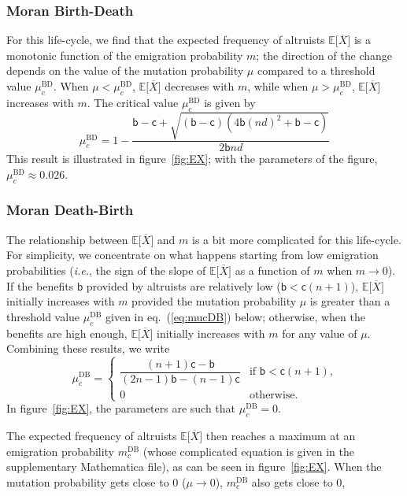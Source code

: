 \documentclass[11pt, letterpaper]{article}
\renewcommand{\eqref}[1]{\textup{{\normalfont eq.~(\ref{#1}}\normalfont)}}
\newcommand{\ie}{\textit{i.e.}}
\newcommand{\Esp}[1]{\mathbb{E}\big[ #1\big]}%
\newcommand{\bb}{\mathsf{b}}
\newcommand{\cc}{\mathsf{c}}
\newcommand{\BD}{\textrm{BD}}
\newcommand{\DB}{\textrm{DB}}
\begin{document}
\subsubsection{Moran Birth-Death}

For this life-cycle, we find that the expected frequency of altruists $\Esp{\overline{X}}$ is a monotonic function of the emigration probability $m$; the direction of the change depends on the value of the mutation probability $\mu$ compared to a threshold value $\mu_c^{\BD}$. When $\mu<\mu_c^{\BD}$, $\Esp{\overline{X}}$ decreases with $m$, while when $\mu>\mu_c^{\BD}$, $\Esp{\overline{X}}$  increases with $m$. The critical value $\mu_c^{\BD}$ is given by 
\begin{equation}\label{eq:mucBD}
\mu_c^{\BD} = %
1 - \frac{\bb  - \cc + \sqrt{(\bb - \cc) \left(4 \bb (n d)^2 + \bb - \cc \right)} }{2 \bb n d}
\end{equation}
%
This result is illustrated in figure~\ref{fig:EX}; with the parameters of the figure, $\mu_c^{\BD} \approx 0.026$.

\subsubsection{Moran Death-Birth}

The relationship between $\Esp{\overline{X}}$ and $m$ is a bit more complicated for this life-cycle. For simplicity, we concentrate on what happens starting from low emigration probabilities (\ie, the sign of the slope of $\Esp{\overline{X}}$ as a function of $m$ when $m\to 0$). If the benefits $\bb$ provided by altruists are relatively low ($\bb < \cc (n+1)$), $\Esp{\overline{X}}$ initially increases with $m$ provided the mutation probability $\mu$ is greater than a threshold value $\mu_c^{\DB}$ given in \eqref{eq:mucDB} below; otherwise, when the benefits are high enough, $\Esp{\overline{X}}$ initially increases with $m$ for any value of $\mu$. Combining these results, we write
\begin{equation}\label{eq:mucDB}
\mu_c^{\DB} = \begin{cases}
\dfrac{ (n+1) \cc - \bb}{ (2 n - 1) \bb - (n-1) \cc} & \textrm{if $\bb < \cc (n+1)$,} \\
%
0 & \textrm{otherwise. }
\end{cases}
\end{equation} 
%
In figure~\ref{fig:EX}, the parameters are such that $\mu_c^{\DB} = 0$. 

The expected frequency of altruists $\Esp{\overline{X}}$ then reaches a maximum at an emigration probability $m_c^{\DB}$ (whose complicated equation is given in the supplementary Mathematica file), as can be seen in figure~\ref{fig:EX}. When the mutation probability gets close to $0$ ($\mu \to 0$), $m_c^{\DB}$ also gets close to $0$, 
\end{document}
